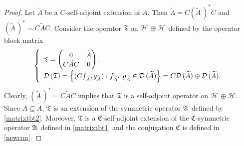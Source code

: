 \documentclass[12pt]{amsart}
\def\sC{{\mathfrak C}}
\theoremstyle{definition}
\newcommand{\gA}{\mathfrak{A}\,}
\newcommand{\cD}{\mathcal{D}\,}
\newcommand{\cH}{\mathcal{H}\,}
\newcommand{\gC}{\mathfrak{C}}
\newcommand{\gT}{\mathfrak{T}}
\begin{document}
\begin{proof}
 Let $\widetilde A$ be a $C$-self-adjoint extension of $A$. Then $\widetilde A= C(\widetilde A\, )^*C$ and $(\widetilde A\, )^*=C\widetilde AC$. Consider the operator $\gT$ on $\cH\oplus \cH$ defined by the operator block matrix
\begin{equation}
\label{matrixtbt3}
\left\{\begin{array}{l}\gT=
\begin{pmatrix}
 0 & \widetilde A\cr C\widetilde A C & 0
\end{pmatrix},\\[2mm]
\cD(\gT)=\left\{(Cf_{\widetilde A},g_{\widetilde A}): f_{\widetilde A},\; g_{\widetilde A}\in\cD(\widetilde A)\right\}=C\cD(\widetilde A)\oplus\cD(\widetilde A).
\end{array}\right.
\end{equation}
Clearly, $(\widetilde A\, )^*= C\widetilde AC$ implies that $\gT$ is a self-adjoint operator on $\cH\oplus  \cH$. Since $A\subseteq \widetilde A$, $\gT$ is an extension of the symmetric operator $\gA$ defined by \eqref{matrixtbt2}.
Moreover, $\gT$ is a $\gC$-self-adjoint extension of the $\sC$-symmetric operator $\gA$ defined in \eqref{matrixtbt1} and the conjugation $\gC$ is defined in \eqref{newcon}.


\end{proof}
\end{document}
